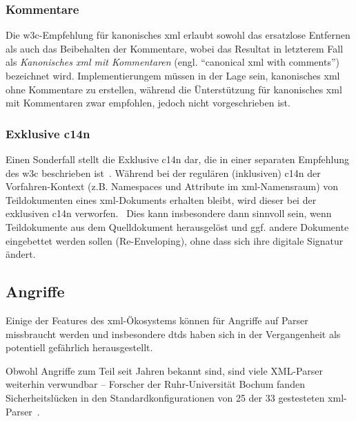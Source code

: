 \subsubsection{Kommentare}
\label{sec:c14ncomments}

Die \gls{w3c}-Empfehlung für kanonisches \acrshort{xml} erlaubt sowohl das ersatzlose Entfernen als auch das Beibehalten der Kommentare, wobei das Resultat in letzterem Fall als \emph{Kanonisches \acrshort{xml} mit Kommentaren} (engl. \enquote{canonical \acrshort{xml} with comments})~\cite[Abschnitt 2.1]{boyer2001c14n} bezeichnet wird. Implementierungem müssen in der Lage sein, kanonisches \acrshort{xml} ohne Kommentare zu erstellen, während die Ünterstützung für kanonisches \acrshort{xml} mit Kommentaren zwar empfohlen, jedoch nicht vorgeschrieben ist.

\subsubsection{Exklusive \acrlong{c14n}}
\label{sec:excc14n}

Einen Sonderfall stellt die Exklusive \acrlong{c14n} dar, die in einer separaten Empfehlung des \gls{w3c} beschrieben ist~\cite{boyer2002excc14n}. Während bei der regulären (inklusiven) \acrlong{c14n} der Vorfahren-Kontext (z.B. Namespaces und Attribute im \acrshort{xml}-Namensraum) von Teildokumenten eines \acrshort{xml}-Dokuments erhalten bleibt, wird dieser bei der exklusiven \acrshort{c14n} verworfen.~\cite[Abschnitt~18]{siddiqui2002c14n2} Dies kann insbesondere dann sinnvoll sein, wenn Teildokumente aus dem Quelldokument herausgelöst und ggf. andere Dokumente eingebettet werden sollen (Re-Enveloping), ohne dass sich ihre digitale Signatur ändert.

\subsection{Angriffe}
\label{sec:xmlattacks}

Einige der Features des \acrshort{xml}-Ökosystems können für Angriffe auf Parser missbraucht werden und insbesondere \glspl{dtd} haben sich in der Vergangenheit als potentiell gefährlich herausgestellt.~\cite[S.~4]{morgan2014xml}

Obwohl Angriffe zum Teil seit Jahren bekannt sind, sind viele XML-Parser weiterhin verwundbar -- Forscher der Ruhr-Universität Bochum fanden Sicherheitslücken in den Standardkonfigurationen von 25 der 33 gestesteten \acrshort{xml}-Parser~\cite{spaeth2016sok}.


